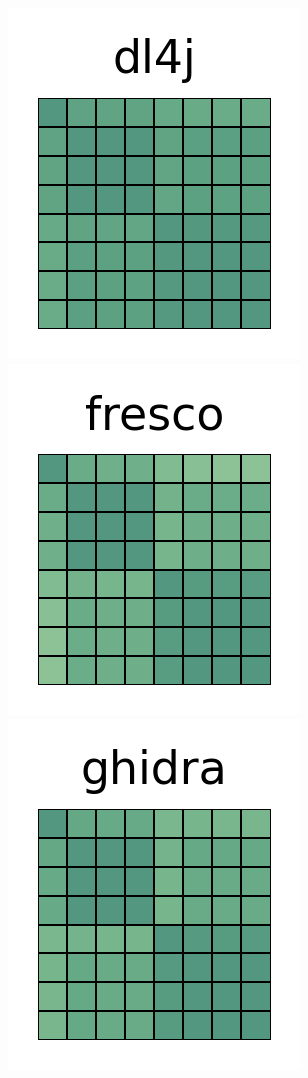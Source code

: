 \documentclass[10pt,conference]{IEEEtran}
\begin{document}
\begin{figure}[htb!]
 \includegraphics[width=\heatmapWidth, keepaspectratio]{entropy-correlations/deeplearning4j-grids.png}
 \includegraphics[width=\heatmapWidth, keepaspectratio]{entropy-correlations/fresco-grids.png} \\
 \includegraphics[width=\heatmapWidth, keepaspectratio]{entropy-correlations/ghidra-grids.png}

\end{figure}
\end{document}
